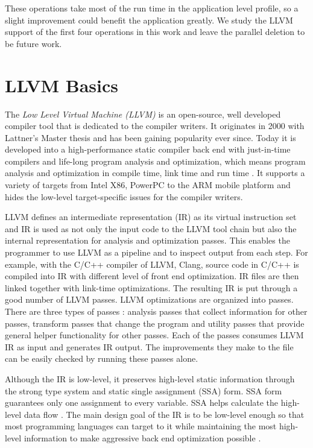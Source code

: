 These operations take most of the run time in the application level profile, so a slight improvement could benefit the application greatly. We study the LLVM support of the first four operations in this work and leave the parallel deletion to be future work.

\section{LLVM Basics}
The \textit{Low Level Virtual Machine (LLVM)} is an open-source, well developed compiler tool that is dedicated to the compiler writers. It originates in 2000 with Lattner's Master thesis \cite{chris_msthesis} and has been gaining popularity ever since. Today it is developed into a high-performance static compiler back end with just-in-time compilers and life-long program analysis and optimization, which means program analysis and optimization in compile time, link time and run time \cite{llvm_ghc, llvm_cgo04}. It supports a variety of targets from Intel X86, PowerPC to the ARM mobile platform and hides the low-level target-specific issues for the compiler writers.

LLVM defines an intermediate representation (IR) as its virtual instruction set and IR is used as not only the input code to the LLVM tool chain but also the internal representation for analysis and optimization passes. This enables the programmer to use LLVM as a pipeline and to inspect output from each step. For example, with the C/C++ compiler of LLVM, Clang, source code in C/C++ is compiled into IR with different level of front end optimization. IR files are then linked together with link-time optimizations. The resulting IR is put through a good number of LLVM passes. LLVM optimizations are organized into passes. There are three types of passes \cite{llvm_pass}: analysis passes that collect information for other passes, transform passes that change the program and utility passes that provide general helper functionality for other passes. Each of the passes consumes LLVM IR as input and generates IR output. The improvements they make to the file can be easily checked by running these passes alone.

Although the IR is low-level, it preserves high-level static information through the strong type system and static single assignment (SSA) form. SSA form guarantees only one assignment to every variable. SSA helps calculate the high-level data flow \cite{cytron1991efficiently}. The main design goal of the IR is to be low-level enough so that most programming languages can target to it while maintaining the most high-level information to make aggressive back end optimization possible \cite{llvm_ghc}.

